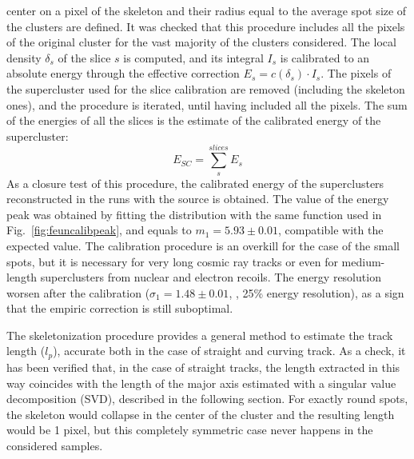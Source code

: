 center on a pixel of the skeleton and their radius equal to the
average spot size of the \fe clusters are defined. It was checked
that this procedure includes all the pixels of the original cluster
for the vast majority of the clusters considered.  The local density
$\delta_s$ of the slice $s$ is computed, and its integral $I_s$ is
calibrated to an absolute energy through the effective correction
$E_s=c(\delta_s)\cdot I_s$. The pixels of the supercluster used for
the slice calibration are removed (including the skeleton ones), and
the procedure is iterated, until having included all the pixels. The
sum of the energies of all the slices is the estimate of the
calibrated energy of the supercluster:
%
\begin{equation}
  \label{eq:ecal}
  E_{SC} = \sum_s^{slices} E_s
\end{equation}
%
As a closure test of this procedure, the calibrated energy of the
superclusters reconstructed in the runs with the \fe source is
obtained.  The value of the energy peak was obtained by fitting the
distribution with the same function used in
Fig.~\ref{fig:feuncalibpeak}, and equals to  $m_1 = 5.93 \pm 0.01$\keV,
compatible with the expected value. The calibration procedure is an
overkill for the case of the small \fe spots, but it is necessary for
very long cosmic ray tracks or even for medium-length superclusters
from nuclear and electron recoils.  The energy resolution worsen after
the calibration ($\sigma_1 = 1.48 \pm 0.01$, \ie, 25\% energy
resolution), as a sign that the empiric correction is still
suboptimal.

The skeletonization procedure provides a general method to estimate
the track length ($l_p$), accurate both in the case of straight and
curving track. As a check, it has been verified that, in the case of
straight tracks, the length extracted in this way coincides with the
length of the major axis estimated with a singular value decomposition
(SVD), described in the following section. For exactly round spots,
the skeleton would collapse in the center of the cluster and the
resulting length would be 1 pixel, but this completely symmetric case
never happens in the considered samples.
